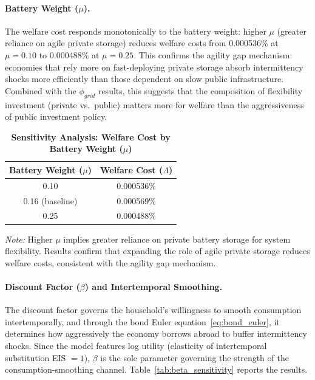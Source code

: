 \documentclass[12pt, a4paper]{article}
\begin{document}
	\paragraph{Battery Weight ($\mu$).} The welfare cost responds monotonically to the battery weight: higher $\mu$ (greater reliance on agile private storage) reduces welfare costs from 0.000536\% at $\mu = 0.10$ to 0.000488\% at $\mu = 0.25$. This confirms the agility gap mechanism: economies that rely more on fast-deploying private storage absorb intermittency shocks more efficiently than those dependent on slow public infrastructure. Combined with the $\phi_{grid}$ results, this suggests that the composition of flexibility investment (private vs.\ public) matters more for welfare than the aggressiveness of public investment policy.

	\begin{table}[H]
		\centering
		\caption{\textbf{Sensitivity Analysis: Welfare Cost by Battery Weight ($\mu$)}}
		\renewcommand{\arraystretch}{1.3}
		\begin{tabular}{c c}
			\toprule
			\textbf{Battery Weight ($\mu$)} & \textbf{Welfare Cost ($\Lambda$)} \\
			\midrule
			0.10 & 0.000536\% \\
			0.16 (baseline) & 0.000569\% \\
			0.25 & 0.000488\% \\
			\bottomrule
		\end{tabular}
		\vspace{0.2cm}
		\parbox{\textwidth}{\footnotesize \textit{Note:} Higher $\mu$ implies greater reliance on private battery storage for system flexibility. Results confirm that expanding the role of agile private storage reduces welfare costs, consistent with the agility gap mechanism.}
	\end{table}

	\paragraph{Discount Factor ($\beta$) and Intertemporal Smoothing.} The discount factor governs the household's willingness to smooth consumption intertemporally, and through the bond Euler equation~\eqref{eq:bond_euler}, it determines how aggressively the economy borrows abroad to buffer intermittency shocks. Since the model features log utility (elasticity of intertemporal substitution EIS $= 1$), $\beta$ is the sole parameter governing the strength of the consumption-smoothing channel. Table~\ref{tab:beta_sensitivity} reports the results.
\end{document}

